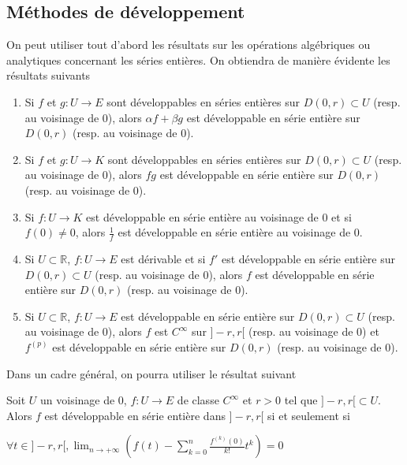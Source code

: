 \subsection{Méthodes de développement}

On peut utiliser tout d'abord les résultats sur les opérations algébriques ou analytiques concernant les séries entières. On obtiendra de manière évidente les résultats suivants

\begin{thm}
\begin{enumerate}
\item Si $f$ et $g : U \rightarrow E$ sont développables en séries entières sur $D(0,r) \subset U$ (resp. au voisinage de 0), alors $\alpha f + \beta g$ est développable en série entière sur $D(0,r)$ (resp. au voisinage de 0).
\item Si $f$ et $g : U \rightarrow K$ sont développables en séries entières sur $D(0,r) \subset U$ (resp. au voisinage de 0), alors $fg$ est développable en série entière sur $D(0,r)$ (resp. au voisinage de 0).
\item Si $f : U \rightarrow K$ est développable en série entière au voisinage de 0 et si $f(0) \neq 0$, alors $\frac{1}{f}$ est développable en série entière au voisinage de 0.
\item Si $U \subset \mathbb{R}$, $f : U \rightarrow E$ est dérivable et si $f'$ est développable en série entière sur $D(0,r) \subset U$ (resp. au voisinage de 0), alors $f$ est développable en série entière sur $D(0,r)$ (resp. au voisinage de 0).
\item Si $U \subset \mathbb{R}$, $f : U \rightarrow E$ est développable en série entière sur $D(0,r) \subset U$ (resp. au voisinage de 0), alors $f$ est $C^\infty$ sur $]-r,r[$ (resp. au voisinage de 0) et $f^{(p)}$ est développable en série entière sur $D(0,r)$ (resp. au voisinage de 0).
\end{enumerate}
\end{thm}

Dans un cadre général, on pourra utiliser le résultat suivant

\begin{thm}
Soit $U$ un voisinage de 0, $f : U \rightarrow E$ de classe $C^\infty$ et $r > 0$ tel que $]-r,r[ \subset U$. Alors $f$ est développable en série entière dans $]-r,r[$ si et seulement si

$\forall t \in ]-r,r[, \lim_{n \rightarrow +\infty} \left(f(t) - \sum_{k=0}^n \frac{f^{(k)}(0)}{k!} t^k \right) = 0$
\end{thm}

